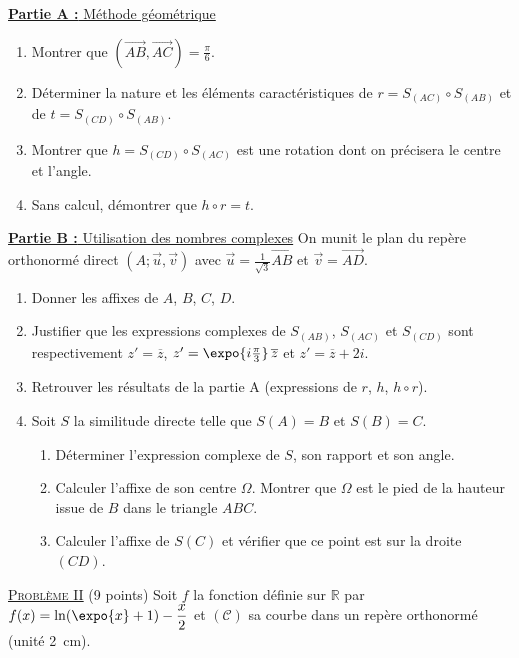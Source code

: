 \underline{\textbf{Partie A :} M\'ethode g\'eom\'etrique}
\begin{enumerate}
      \item Montrer que $(\overrightarrow{AB}, \overrightarrow{AC}) = \frac{\pi}{6}$.
      \item D\'eterminer la nature et les \'el\'ements caract\'eristiques de $r = S_{(AC)} \circ S_{(AB)}$ et de $t = S_{(CD)} \circ S_{(AB)}$.
      \item Montrer que $h = S_{(CD)} \circ S_{(AC)}$ est une rotation dont on pr\'ecisera le centre et l'angle.
      \item Sans calcul, d\'emontrer que $h \circ r = t$.
\end{enumerate}
\underline{\textbf{Partie B :} Utilisation des nombres complexes} \newline
On munit le plan du rep\`ere orthonorm\'e direct $\left(A ; \vec{u}, \vec{v}\right)$ avec $\vec{u} = \frac{1}{\sqrt{3}}\overrightarrow{AB}$
et $\vec{v} = \overrightarrow{AD}$.
\begin{enumerate}
      \item Donner les affixes de $A$, $B$, $C$, $D$.
      \item Justifier que les expressions complexes de $S_{(AB)}$, $S_{(AC)}$ et $S_{(CD)}$ sont respectivement
            $z' = \overline{z}$, $z' = \expo{i\frac{\pi}{3}}\,\overline{z}$ et $z' = \overline{z} + 2i$.
      \item Retrouver les r\'esultats de la partie A (expressions de $r$, $h$, $h \circ r$).
      \item Soit $S$ la similitude directe telle que $S(A) = B$ et $S(B) = C$.
            \begin{enumerate}
            \item D\'eterminer l'expression complexe de $S$, son rapport et son angle.
            \item Calculer l'affixe de son centre $\Omega$. Montrer que $\Omega$ est le pied de la hauteur issue de $B$
                  dans le triangle $ABC$.
            \item Calculer l'affixe de $S(C)$ et v\'erifier que ce point est sur la droite $(CD)$.
            \end{enumerate}
\end{enumerate}

\noindent \underline{\textsc{Probl\`eme II}} (9 points) \newline
Soit $f$ la fonction d\'efinie sur $\mathbb{R}$ par $f(x) = \ln(\expo{x} + 1) - \dfrac{x}{2}$ et $(\mathscr{C})$ sa courbe
dans un rep\`ere orthonorm\'e (unit\'e 2~cm).

